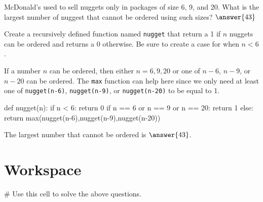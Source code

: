 \documentclass{ximera}
\begin{document}
\begin{question}
McDonald's used to sell nuggets only in packages of size 6, 9, and 20. What is the largest number of nuggest that cannot be ordered using such sizes? $\answer{43}$
	\begin{hint}
Create a recursively defined function named \verb|nugget| that return a 1 if $n$ nuggets can be ordered and returns a 0 otherwise. Be sure to create a case for when $n<6$.
	\end{hint}
	\begin{hint}
	If a number $n$ can be ordered, then either $n=6,9,20$ or one of $n-6$, $n-9$, or $n-20$ can be ordered. The \verb|max| function can help here since we only need at least one of \verb|nugget(n-6)|, \verb|nugget(n-9)|, or \verb|nugget(n-20)| to be equal to 1.
	\end{hint}
\begin{hint}
\begin{sageCell}
def nugget(n):
        if n < 6:
                return 0
        if n == 6 or n == 9 or n == 20:
                return 1
        else:
                return max(nugget(n-6),nugget(n-9),nugget(n-20))
\end{sageCell}
	\end{hint}
The largest number that cannot be ordered is $\answer{43}$.
\end{question}

\section{Workspace}

\begin{sageCell}
# Use this cell to solve the above questions.
\end{sageCell}
\end{document}
